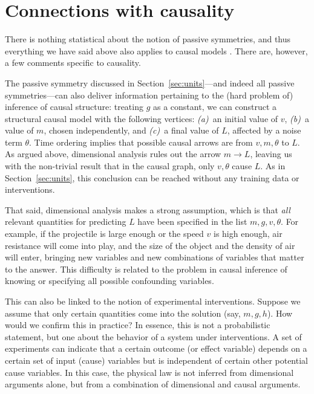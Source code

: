 \documentclass{article}
\theoremstyle{plain}
\theoremstyle{definition}
\theoremstyle{remark}
\newcommand{\sectionname}{Section}
\newcommand{\secref}[1]{\sectionname~\ref{#1}}
\begin{document}
\section{Connections with causality}\label{sec:causality}

There is nothing statistical about the notion of passive symmetries, and thus everything we have said above also applies to causal models \cite{PetJanSch17}. There are, however, a few comments specific to causality.

The passive symmetry discussed in \secref{sec:units}---and indeed all passive symmetries---can also deliver information pertaining to the (hard problem of) inference of causal structure:
treating $g$ as a constant, we can construct a structural causal model with the following vertices: \textsl{(a)}~an initial value of $v$, \textsl{(b)}~a value of $m$, chosen independently, and \textsl{(c)}~a final value of $L$, affected by a noise term $\theta$.
Time ordering implies that possible causal arrows are from $v, m, \theta$ to $L$.
As argued above, dimensional analysis rules out the arrow $m\to L$, leaving us with the non-trivial result that in the causal graph, only $v,\theta$ cause $L$.
As in \secref{sec:units}, this conclusion can be reached without any training data or interventions.

That said, dimensional analysis makes a strong assumption, which is that {\em all} relevant quantities for predicting $L$ have been specified in the list $m, g, v, \theta$.
For example, if the projectile is large enough or the speed $v$ is high enough, air resistance will come into play, and the size of the object and the density of air will enter, bringing new variables and new combinations of variables that matter to the answer.
This difficulty is related to the problem in causal inference of knowing or specifying all possible confounding variables.

This can also be linked to the notion of experimental interventions. Suppose we assume that only certain quantities come into the solution (say, $m, g, h$). How would we confirm this in practice? In essence, this is not a probabilistic statement, but one about the behavior of a system under interventions. A set of experiments can indicate that a certain outcome (or effect variable) depends on a certain set of input (cause) variables but is independent of certain other potential cause variables. In this case, the physical law is not inferred from dimensional arguments alone, but from a combination of dimensional and causal arguments.
\end{document}
